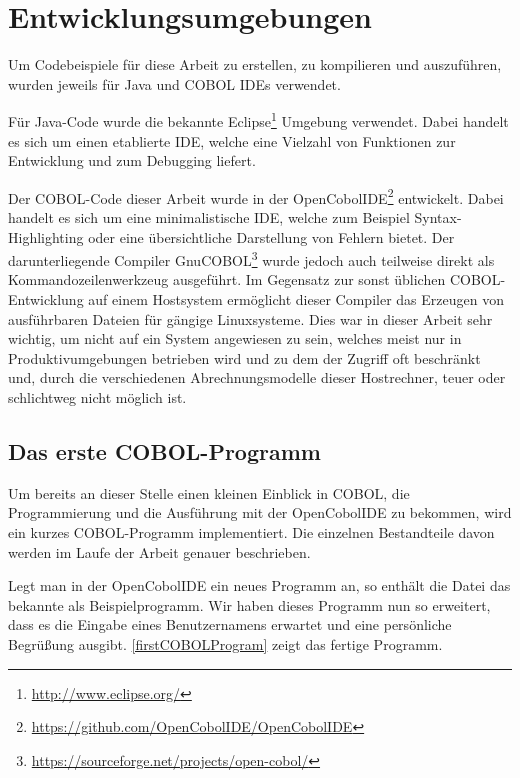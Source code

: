 \section{Entwicklungsumgebungen}
Um Codebeispiele für diese Arbeit zu erstellen, zu kompilieren und auszuführen, wurden jeweils für Java und COBOL IDEs verwendet.

Für Java-Code wurde die bekannte Eclipse\footnote{\url{http://www.eclipse.org/} \visitedOn} Umgebung verwendet. Dabei handelt es sich um einen etablierte IDE, welche eine Vielzahl von Funktionen zur Entwicklung und zum Debugging liefert.

Der COBOL-Code dieser Arbeit wurde in der OpenCobolIDE\footnote{\url{https://github.com/OpenCobolIDE/OpenCobolIDE} \visitedOn} entwickelt. Dabei handelt es sich um eine minimalistische IDE, welche zum Beispiel Syntax-Highlighting oder eine übersichtliche Darstellung von Fehlern bietet. Der darunterliegende Compiler GnuCOBOL\footnote{\url{https://sourceforge.net/projects/open-cobol/} \visitedOn} wurde jedoch auch teilweise direkt als Kommandozeilenwerkzeug ausgeführt. Im Gegensatz zur sonst üblichen COBOL-Entwicklung auf einem Hostsystem ermöglicht dieser Compiler das Erzeugen von ausführbaren Dateien für gängige Linuxsysteme. Dies war in dieser Arbeit sehr wichtig, um nicht auf ein System angewiesen zu sein, welches meist nur in Produktivumgebungen betrieben wird und zu dem der Zugriff oft beschränkt und, durch die verschiedenen Abrechnungsmodelle dieser Hostrechner, teuer oder schlichtweg nicht möglich ist.

\subsection*{Das erste COBOL-Programm}

Um bereits an dieser Stelle einen kleinen Einblick in COBOL, die Programmierung und die Ausführung mit der OpenCobolIDE zu bekommen, wird ein kurzes COBOL-Programm implementiert. Die einzelnen Bestandteile davon werden im Laufe der Arbeit genauer beschrieben.


Legt man in der OpenCobolIDE ein neues Programm an, so enthält die Datei das bekannte  als Beispielprogramm. Wir haben dieses Programm nun so erweitert, dass es die Eingabe eines Benutzernamens erwartet und eine persönliche Begrüßung ausgibt. \autoref{firstCOBOLProgram} zeigt das fertige Programm.

